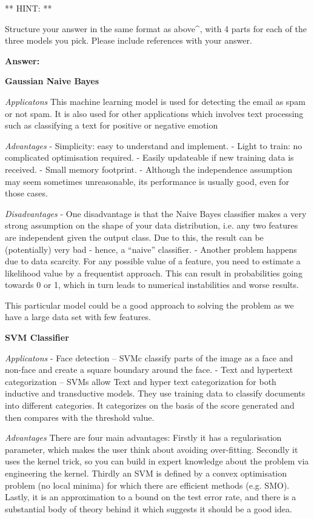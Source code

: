 \documentclass[11pt]{article}
\begin{document}
** HINT: **

Structure your answer in the same format as above\^{}, with 4 parts for
each of the three models you pick. Please include references with your
answer.

    \textbf{Answer: }

\textbf{Gaussian Naive Bayes}

\emph{Applicatons} This machine learning model is used for detecting the
email as spam or not spam. It is also used for other applications which
involves text processing such as classifying a text for positive or
negative emotion

\emph{Advantages} - Simplicity: easy to understand and implement. -
Light to train: no complicated optimisation required. - Easily
updateable if new training data is received. - Small memory footprint. -
Although the independence assumption may seem sometimes unreasonable,
its performance is usually good, even for those cases.

\emph{Disadvantages} - One disadvantage is that the Naive Bayes
classifier makes a very strong assumption on the shape of your data
distribution, i.e. any two features are independent given the output
class. Due to this, the result can be (potentially) very bad - hence, a
``naive'' classifier. - Another problem happens due to data scarcity.
For any possible value of a feature, you need to estimate a likelihood
value by a frequentist approach. This can result in probabilities going
towards 0 or 1, which in turn leads to numerical instabilities and worse
results.

This particular model could be a good approach to solving the problem as
we have a large data set with few features.

\textbf{SVM Classifier}

\emph{Applicatons} - Face detection -- SVMc classify parts of the image
as a face and non-face and create a square boundary around the face. -
Text and hypertext categorization -- SVMs allow Text and hyper text
categorization for both inductive and transductive models. They use
training data to classify documents into different categories. It
categorizes on the basis of the score generated and then compares with
the threshold value.

\emph{Advantages} There are four main advantages: Firstly it has a
regularisation parameter, which makes the user think about avoiding
over-fitting. Secondly it uses the kernel trick, so you can build in
expert knowledge about the problem via engineering the kernel. Thirdly
an SVM is defined by a convex optimisation problem (no local minima) for
which there are efficient methods (e.g. SMO). Lastly, it is an
approximation to a bound on the test error rate, and there is a
substantial body of theory behind it which suggests it should be a good
idea.
\end{document}
